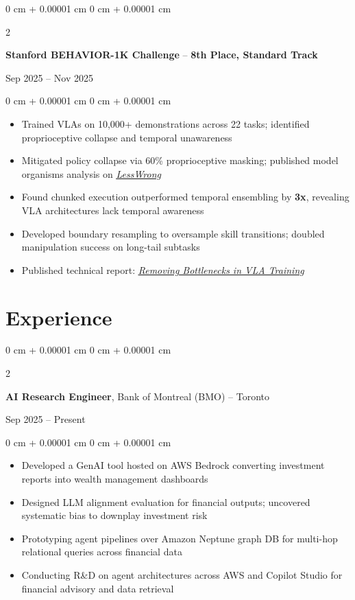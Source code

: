 \documentclass[10pt, letterpaper]{article}
\newenvironment{highlights}{
    \begin{itemize}[
        topsep=0.10 cm,
        parsep=0.10 cm,
        partopsep=0pt,
        itemsep=0pt,
        leftmargin=0 cm + 10pt
    ]
}{
    \end{itemize}
} %
\newenvironment{onecolentry}{
    \begin{adjustwidth}{
        0 cm + 0.00001 cm
    }{
        0 cm + 0.00001 cm
    }
}{
    \end{adjustwidth}
} %
\newenvironment{twocolentry}[2][]{
    \onecolentry
    \def\secondColumn{#2}
    \setcolumnwidth{\fill, 4.5 cm}
    \begin{paracol}{2}
}{
    \switchcolumn \raggedleft \secondColumn
    \end{paracol}
    \endonecolentry
} %
\let\hrefWithoutArrow\href
\begin{document}
    \vspace{0.2 cm}
    \begin{twocolentry}{Sep 2025 – Nov 2025}
        \textbf{Stanford BEHAVIOR-1K Challenge} -- \textbf{8th Place, Standard Track}
    \end{twocolentry}
    \vspace{0.10 cm}
    \begin{onecolentry}
        \begin{highlights}
            \item Trained VLAs on 10,000+ demonstrations across 22 tasks; identified proprioceptive collapse and temporal unawareness
            \item Mitigated policy collapse via 60\% proprioceptive masking; published model organisms analysis on \hrefWithoutArrow{https://www.lesswrong.com/posts/4p2HBMxCkh7pZ3xCa}{\emph{\ul{LessWrong}}}
            \item Found chunked execution outperformed temporal ensembling by \textbf{3x}, revealing VLA architectures lack temporal awareness
            \item Developed boundary resampling to oversample skill transitions; doubled manipulation success on long-tail subtasks
            \item Published technical report: \hrefWithoutArrow{https://merlyn-labs.com/behavior-report}{\emph{\ul{Removing Bottlenecks in VLA Training}}}
        \end{highlights}
    \end{onecolentry}

\section{Experience}
    \begin{twocolentry}{Sep 2025 – Present}
        \textbf{AI Research Engineer}, Bank of Montreal (BMO) -- Toronto
    \end{twocolentry}
    \vspace{0.10 cm}
    \begin{onecolentry}
        \begin{highlights}
            \item Developed a GenAI tool hosted on AWS Bedrock converting investment reports into wealth management dashboards
            \item Designed LLM alignment evaluation for financial outputs; uncovered systematic bias to downplay investment risk
            \item Prototyping agent pipelines over Amazon Neptune graph DB for multi-hop relational queries across financial data
            \item Conducting R\&D on agent architectures across AWS and Copilot Studio for financial advisory and data retrieval
        \end{highlights}
    \end{onecolentry}
\end{document}
